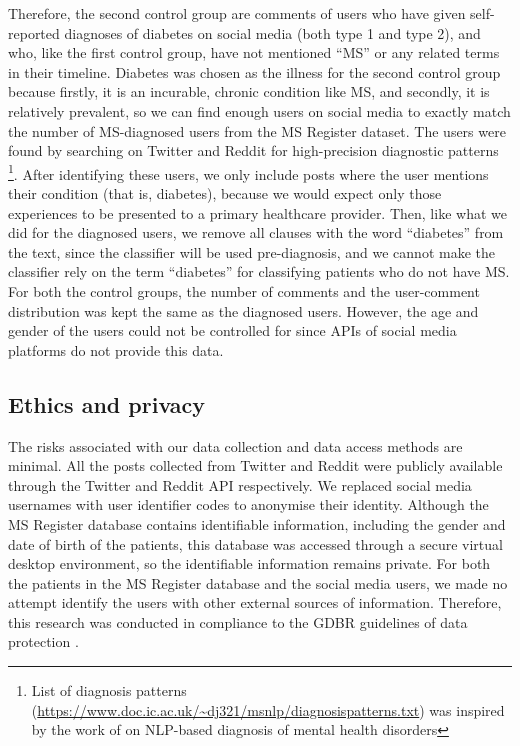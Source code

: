 \documentclass[11pt,a4paper]{article}
\begin{document}
\indent Therefore, the second control group are comments of users who have given self-reported diagnoses of diabetes on social media (both type 1 and type 2), and who, like the first control group, have not mentioned “MS” or any related terms in their timeline. Diabetes was chosen as the illness for the second control group because firstly, it is an incurable, chronic condition like MS, and secondly, it is relatively prevalent, so we can find enough users on social media to exactly match the number of MS-diagnosed users from the MS Register dataset. The users were found by searching on Twitter and Reddit for high-precision diagnostic patterns \footnote{List of diagnosis patterns (\url{https://www.doc.ic.ac.uk/~dj321/msnlp/diagnosispatterns.txt}) was inspired by the work of \citet{Cohan:18} on NLP-based diagnosis of mental health disorders}. After identifying these users, we only include posts where the user mentions their condition (that is, diabetes), because we would expect only those experiences to be presented to a primary healthcare provider. Then, like what we did for the diagnosed users, we remove all clauses with the word “diabetes” from the text, since the classifier will be used pre-diagnosis, and we cannot make the classifier rely on the term “diabetes” for classifying patients who do not have MS. \\
\indent For both the control groups, the number of comments and the user-comment distribution was kept the same as the diagnosed users. However, the age and gender of the users could not be controlled for since APIs of social media platforms do not provide this data.
\subsection{Ethics and privacy}
The risks associated with our data collection and data access methods are minimal. All the posts collected from Twitter and Reddit were publicly available through the Twitter and Reddit API respectively. We replaced social media usernames with user identifier codes to anonymise their identity. Although the MS Register database contains identifiable information, including the gender and date of birth of the patients, this database was accessed through a secure virtual desktop environment, so the identifiable information remains private. For both the patients in the MS Register database and the social media users, we made no attempt identify the users with other external sources of information. Therefore, this research was conducted in compliance to the GDBR guidelines of data protection \citep{GDBR:16}.
\end{document}
